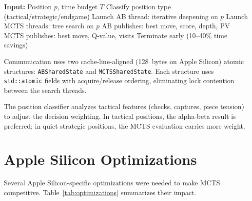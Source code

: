 \documentclass{svproc}
\begin{document}
\begin{algorithm}[!htbp]
\caption{Parallel Hybrid Search}
\label{alg:hybrid}
\begin{algorithmic}[1]
\State \textbf{Input:} Position $p$, time budget $T$
\State Classify position type (tactical/strategic/endgame)
\State Launch AB thread: iterative deepening on $p$
\State Launch MCTS threads: tree search on $p$
    \State AB publishes: best move, score, depth, PV 
    \State MCTS publishes: best move, Q-value, visits 
        \State Terminate early (10--40\% time savings)
    \EndIf
\EndWhile
\State \Return {}
\end{algorithmic}
\end{algorithm}

Communication uses two cache-line-aligned (128~bytes on Apple Silicon) atomic structures: \texttt{ABSharedState} and \texttt{MCTSSharedState}. Each structure uses \texttt{std::atomic} fields with acquire/release ordering, eliminating lock contention between the search threads.

The position classifier analyzes tactical features (checks, captures, piece tension) to adjust the decision weighting. In tactical positions, the alpha-beta result is preferred; in quiet strategic positions, the MCTS evaluation carries more weight.



\FloatBarrier
\section{Apple Silicon Optimizations}
\label{sec:optimizations}

Several Apple Silicon-specific optimizations were needed to make MCTS competitive. Table~\ref{tab:optimizations} summarizes their impact.
\end{document}
